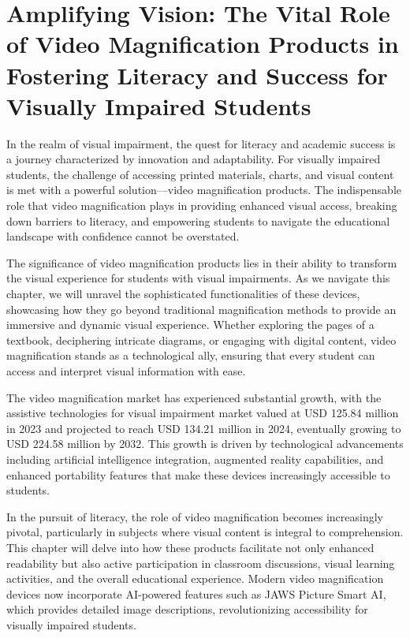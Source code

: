 \chapter{Amplifying Vision: The Vital Role of Video Magnification Products in Fostering Literacy and Success for Visually Impaired Students}\label{chap:video-magnification}

In the realm of visual impairment, the quest for literacy and academic success is a journey characterized by innovation and adaptability. For visually impaired students, the challenge of accessing printed materials, charts, and visual content is met with a powerful solution—video magnification products. The indispensable role that video magnification plays in providing enhanced visual access, breaking down barriers to literacy, and empowering students to navigate the educational landscape with confidence cannot be overstated.

The significance of video magnification products lies in their ability to transform the visual experience for students with visual impairments. As we navigate this chapter, we will unravel the sophisticated functionalities of these devices, showcasing how they go beyond traditional magnification methods to provide an immersive and dynamic visual experience. Whether exploring the pages of a textbook, deciphering intricate diagrams, or engaging with digital content, video magnification stands as a technological ally, ensuring that every student can access and interpret visual information with ease.

The video magnification market has experienced substantial growth, with the assistive technologies for visual impairment market valued at USD 125.84 million in 2023 and projected to reach USD 134.21 million in 2024, eventually growing to USD 224.58 million by 2032. This growth is driven by technological advancements including artificial intelligence integration, augmented reality capabilities, and enhanced portability features that make these devices increasingly accessible to students.

In the pursuit of literacy, the role of video magnification becomes increasingly pivotal, particularly in subjects where visual content is integral to comprehension. This chapter will delve into how these products facilitate not only enhanced readability but also active participation in classroom discussions, visual learning activities, and the overall educational experience. Modern video magnification devices now incorporate AI-powered features such as JAWS Picture Smart AI, which provides detailed image descriptions, revolutionizing accessibility for visually impaired students.

